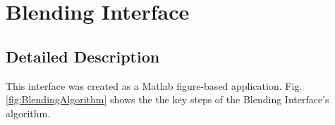 \documentclass[11pt, oneside]{report}   	%
\begin{document}

\pagebreak
\section{Blending Interface}
\subsection{Detailed Description}\label{sec:BlendingDescription}
This interface was created as a Matlab figure-based application. Fig. \ref{fig:BlendingAlgorithm} shows the the key steps of the Blending Interface's algorithm.
\end{document}
